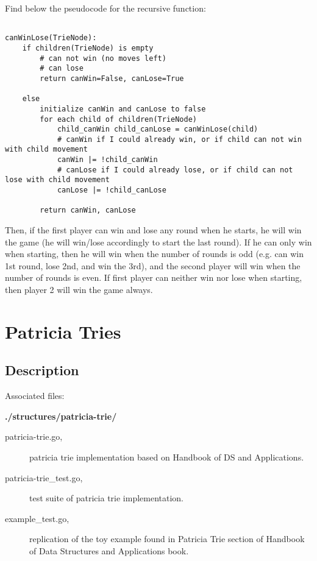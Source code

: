 \documentclass[a4paper,10pt,table,xcdraw]{article}
\begin{document}
Find below the pseudocode for the recursive function:

\begin{verbatim}

canWinLose(TrieNode): 
	if children(TrieNode) is empty
        # can not win (no moves left)
        # can lose 
        return canWin=False, canLose=True
        
    else 
        initialize canWin and canLose to false
        for each child of children(TrieNode)
            child_canWin child_canLose = canWinLose(child)
            # canWin if I could already win, or if child can not win with child movement
            canWin |= !child_canWin 
            # canLose if I could already lose, or if child can not lose with child movement
            canLose |= !child_canLose
	
        return canWin, canLose
\end{verbatim}

Then, if the first player can win and lose any round when he starts, he will win the game (he will win/lose accordingly to start the last round). If he can only win when starting, then he will win when the number of rounds is odd (e.g. can win 1st round, lose 2nd, and win the 3rd), and the second player will win when the number of rounds is even. If first player can neither win nor lose when starting, then player 2 will win the game always.


\section{Patricia Tries}
\label{sec:patricia-tries}

\subsection{Description}

Associated files:

\textbf{./structures/patricia-trie/}
\begin{description}
\item [\hspace{10mm} patricia-trie.go,] patricia trie implementation based on Handbook of DS and Applications.
\item [\hspace{10mm} patricia-trie\_test.go,] test suite of patricia trie implementation.
\item [\hspace{10mm} example\_test.go,] replication of the toy example found in Patricia Trie section of Handbook of Data Structures and Applications book.

\end{description}
\end{document}

